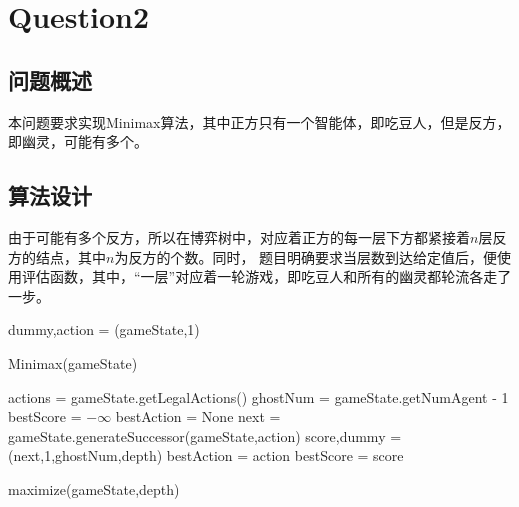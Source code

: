 \chapter{Question2}
\section{问题概述}
%
%
本问题要求实现Minimax算法，其中正方只有一个智能体，即吃豆人，但是反方，即幽灵，可能有多个。
%
%
%
%
\section{算法设计}
%
%
由于可能有多个反方，所以在博弈树中，对应着正方的每一层下方都紧接着$n$层反方的结点，其中$n$为反方的个数。同时，
题目明确要求当层数到达给定值后，便使用评估函数，其中，“一层”对应着一轮游戏，即吃豆人和所有的幽灵都轮流各走了一步。

\begin{algorithm}[h]
    dummy,action = \maximize(gameState,1)\;
    \caption{Minimax(gameState)}
\end{algorithm}

\begin{procedure}[h]
    \;
    actions = gameState.getLegalActions()\;
    ghostNum = gameState.getNumAgent - 1\;
    {}
    bestScore = $-\infty$\;
    bestAction = None\;
    {
        next = gameState.generateSuccessor(gameState,action)\;
        score,dummy = \minimize(next,1,ghostNum,depth)\;
        {
            bestAction = action\;
            bestScore = score\;
        }
    }
    \caption{maximize(gameState,depth)}
\end{procedure}

